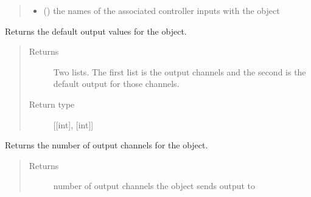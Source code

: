 \documentclass[letterpaper,10pt,english]{sphinxmanual}
\begin{document}
\begin{fulllineitems}
\begin{fulllineitems}
\begin{quote}
\begin{description}
\begin{itemize}
\item {} 
\sphinxAtStartPar
{} (\sphinxstyleliteralemphasis{\sphinxupquote{{[}}}\sphinxstyleliteralemphasis{\sphinxupquote{{]}}}) \textendash{} the names of the associated controller inputs with 
the object

\end{itemize}

\end{description}\end{quote}

\end{fulllineitems}


\begin{fulllineitems}
\label{\detokenize{specific:EyebrowsOutput.EyebrowsOutput.get_default_outputs}}
\sphinxAtStartPar
Returns the default output values for the object.
\begin{quote}\begin{description}
\item[{Returns}] \leavevmode
\sphinxAtStartPar
Two lists. The first list is the output channels and the second 
is the default output for those channels.

\item[{Return type}] \leavevmode
\sphinxAtStartPar
{[}{[}int{]}, {[}int{]}{]}

\end{description}\end{quote}

\end{fulllineitems}


\begin{fulllineitems}
\label{\detokenize{specific:EyebrowsOutput.EyebrowsOutput.get_num_channels}}
\sphinxAtStartPar
Returns the number of output channels for the object.
\begin{quote}\begin{description}
\item[{Returns}] \leavevmode
\sphinxAtStartPar
number of output channels the object sends output to


\end{description}
\end{quote}
\end{fulllineitems}
\end{fulllineitems}
\end{document}
